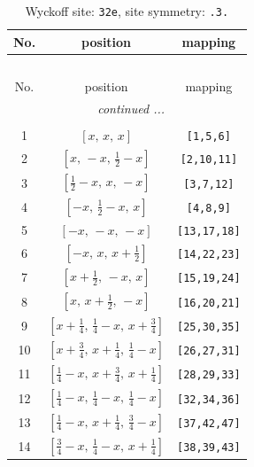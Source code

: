 \documentclass[fleqn,8pt]{jsarticle}
\begin{document}
\renewcommand{\arraystretch}{1.2}
\begin{longtable}{ccc}
\caption{Wyckoff site: {\tt 32e}, site symmetry: {\tt .3.}}
 \\
 \hline \hline
No. & position & mapping \\ \hline \endfirsthead

\multicolumn{2}{l}{\tablename\ \thetable{}} \\
 \hline \hline
No. & position & mapping \\ \hline \endhead

 \hline \hline
\multicolumn{2}{r}{\footnotesize\it continued ...} \\ \endfoot

 \hline \hline
\multicolumn{2}{r}{} \\ \endlastfoot

1 & $\left[ x,\, x,\, x \right]$ & {\tt [1,5,6]} \\ \hline
2 & $\left[ x,\, - x,\, \frac{1}{2} - x \right]$ & {\tt [2,10,11]} \\ \hline
3 & $\left[ \frac{1}{2} - x,\, x,\, - x \right]$ & {\tt [3,7,12]} \\ \hline
4 & $\left[ - x,\, \frac{1}{2} - x,\, x \right]$ & {\tt [4,8,9]} \\ \hline
5 & $\left[ - x,\, - x,\, - x \right]$ & {\tt [13,17,18]} \\ \hline
6 & $\left[ - x,\, x,\, x + \frac{1}{2} \right]$ & {\tt [14,22,23]} \\ \hline
7 & $\left[ x + \frac{1}{2},\, - x,\, x \right]$ & {\tt [15,19,24]} \\ \hline
8 & $\left[ x,\, x + \frac{1}{2},\, - x \right]$ & {\tt [16,20,21]} \\ \hline
9 & $\left[ x + \frac{1}{4},\, \frac{1}{4} - x,\, x + \frac{3}{4} \right]$ & {\tt [25,30,35]} \\ \hline
10 & $\left[ x + \frac{3}{4},\, x + \frac{1}{4},\, \frac{1}{4} - x \right]$ & {\tt [26,27,31]} \\ \hline
11 & $\left[ \frac{1}{4} - x,\, x + \frac{3}{4},\, x + \frac{1}{4} \right]$ & {\tt [28,29,33]} \\ \hline
12 & $\left[ \frac{1}{4} - x,\, \frac{1}{4} - x,\, \frac{1}{4} - x \right]$ & {\tt [32,34,36]} \\ \hline
13 & $\left[ \frac{1}{4} - x,\, x + \frac{1}{4},\, \frac{3}{4} - x \right]$ & {\tt [37,42,47]} \\ \hline
14 & $\left[ \frac{3}{4} - x,\, \frac{1}{4} - x,\, x + \frac{1}{4} \right]$ & {\tt [38,39,43]} \\ \hline

\end{longtable}
\end{document}
